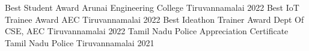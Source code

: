 


\begin{cvhonors}

  \cvhonor
    {Best Student Award} %
    {Arunai Engineering College} %
    {Tiruvannamalai} %
    {2022} %
  \cvhonor
    {Best IoT Trainee Award} %
    {AEC} %
    {Tiruvannamalai} %
    {2022} %
  \cvhonor
    {Best Ideathon Trainer Award} %
    {Dept Of CSE, AEC} %
    {Tiruvannamalai} %
    {2022} %
    \cvhonor
    {Tamil Nadu Police Appreciation Certificate} %
    {Tamil Nadu Police} %
    {Tiruvannamalai} %
    {2021} %
 
\end{cvhonors}